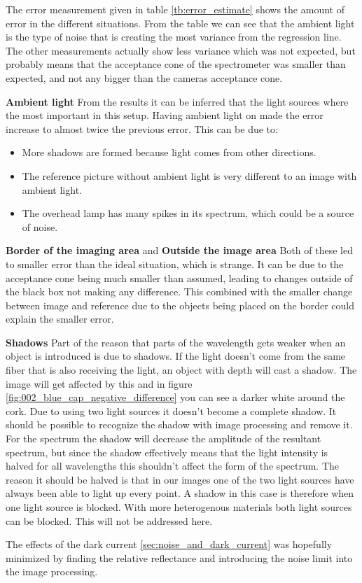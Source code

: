 The error measurement given in table \ref{tb:error_estimate} shows the amount of error in the different situations. From the table we can see that the ambient light is the type of noise that is creating the most variance from the regression line. The other measurements actually show less variance which was not expected, but probably means that the acceptance cone of the spectrometer was smaller than expected, and not any bigger than the cameras acceptance cone. 

\textbf{Ambient light}
From the results it can be inferred that the light sources where the most important in this setup. Having ambient light on made the error increase to almost twice the previous error. This can be due to: 
\begin{itemize}
    \item More shadows are formed because light comes from other directions. 
    \item The reference picture without ambient light is very different to an image with ambient light. 
    \item The overhead lamp has many spikes in its spectrum, which could be a source of noise. 
\end{itemize}


\textbf{Border of the imaging area} and \textbf{Outside the image area}
Both of these led to smaller error than the ideal situation, which is strange. It can be due to the acceptance cone being much smaller than assumed, leading to changes outside of the black box not making any difference. This combined with the smaller change between image and reference due to the objects being placed on the border could explain the smaller error. 

\textbf{Shadows}
Part of the reason that parts of the wavelength gets weaker when an object is introduced is due to shadows. If the light doesn't come from the same fiber that is also receiving the light, an object with depth will cast a shadow. The image will get affected by this and in figure \ref{fig:002_blue_cap_negative_difference} you can see a darker white around the cork. Due to using two light sources it doesn't become a complete shadow. It should be possible to recognize the shadow with image processing and remove it. For the spectrum the shadow will decrease the amplitude of the resultant spectrum, but since the shadow effectively means that the light intensity is halved for all wavelengths this shouldn't affect the form of the spectrum. The reason it should be halved is that in our images one of the two light sources have always been able to light up every point. A shadow in this case is therefore when one light source is blocked. With more heterogenous materials both light sources can be blocked. This will not be addressed here.



The effects of the dark current \ref{sec:noise_and_dark_current} was hopefully minimized by finding the relative reflectance and introducing the noise limit into the image processing. 
